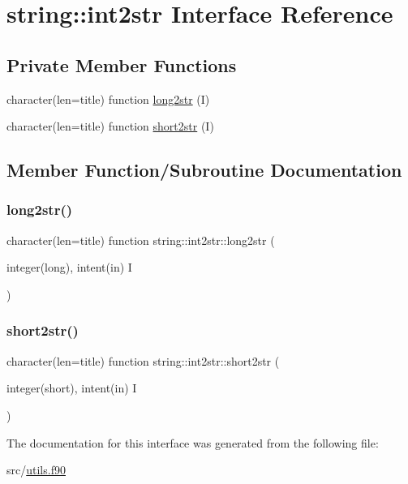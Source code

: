 \hypertarget{interfacestring_1_1int2str}{}\section{string\+:\+:int2str Interface Reference}
\label{interfacestring_1_1int2str}
\subsection*{Private Member Functions}
\begin{DoxyCompactItemize}
\item 
character(len=title) function \hyperlink{interfacestring_1_1int2str_a14b6077d921c2328c519b13461a07271}{long2str} (I)
\item 
character(len=title) function \hyperlink{interfacestring_1_1int2str_aa44f438a3db1b651654481ee5897c02e}{short2str} (I)
\end{DoxyCompactItemize}


\subsection{Member Function/\+Subroutine Documentation}
\mbox{\label{interfacestring_1_1int2str_a14b6077d921c2328c519b13461a07271}} 
\subsubsection{\texorpdfstring{long2str()}{long2str()}}
{\footnotesize\ttfamily character(len=title) function string\+::int2str\+::long2str (\begin{DoxyParamCaption}\item[{integer(long), intent(in)}]{I }\end{DoxyParamCaption})\hspace{0.3cm}{\ttfamily [private]}}

\mbox{\label{interfacestring_1_1int2str_aa44f438a3db1b651654481ee5897c02e}} 
\subsubsection{\texorpdfstring{short2str()}{short2str()}}
{\footnotesize\ttfamily character(len=title) function string\+::int2str\+::short2str (\begin{DoxyParamCaption}\item[{integer(short), intent(in)}]{I }\end{DoxyParamCaption})\hspace{0.3cm}{\ttfamily [private]}}



The documentation for this interface was generated from the following file\+:\begin{DoxyCompactItemize}
\item 
src/\hyperlink{utils_8f90}{utils.\+f90}\end{DoxyCompactItemize}

